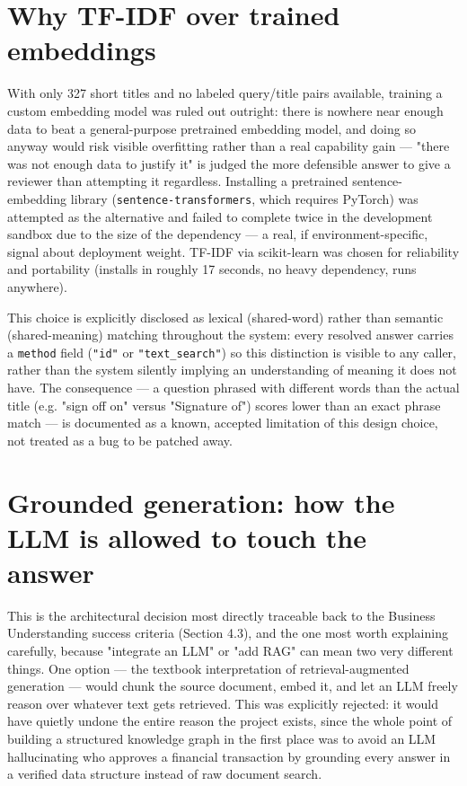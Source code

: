 \section{Why TF-IDF over trained embeddings}
With only 327 short titles and no labeled query/title pairs available, training a custom embedding model was ruled out outright: there is nowhere near enough data to beat a general-purpose pretrained embedding model, and doing so anyway would risk visible overfitting rather than a real capability gain — "there was not enough data to justify it" is judged the more defensible answer to give a reviewer than attempting it regardless. Installing a pretrained sentence-embedding library (\texttt{sentence-transformers}, which requires PyTorch) was attempted as the alternative and failed to complete twice in the development sandbox due to the size of the dependency — a real, if environment-specific, signal about deployment weight. TF-IDF via scikit-learn was chosen for reliability and portability (installs in roughly 17 seconds, no heavy dependency, runs anywhere).

This choice is explicitly disclosed as lexical (shared-word) rather than semantic (shared-meaning) matching throughout the system: every resolved answer carries a \texttt{method} field (\texttt{"id"} or \texttt{"text\_\allowbreak{}search"}) so this distinction is visible to any caller, rather than the system silently implying an understanding of meaning it does not have. The consequence — a question phrased with different words than the actual title (e.g. "sign off on" versus "Signature of") scores lower than an exact phrase match — is documented as a known, accepted limitation of this design choice, not treated as a bug to be patched away.

\section{Grounded generation: how the LLM is allowed to touch the answer}
This is the architectural decision most directly traceable back to the Business Understanding success criteria (Section 4.3), and the one most worth explaining carefully, because "integrate an LLM" or "add RAG" can mean two very different things. One option — the textbook interpretation of retrieval-augmented generation — would chunk the source document, embed it, and let an LLM freely reason over whatever text gets retrieved. This was explicitly rejected: it would have quietly undone the entire reason the project exists, since the whole point of building a structured knowledge graph in the first place was to avoid an LLM hallucinating who approves a financial transaction by grounding every answer in a verified data structure instead of raw document search.

